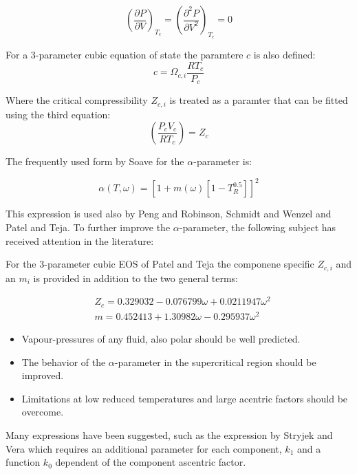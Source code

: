 \documentclass[a4paper, 12pt, english, sintefheadings, sintefcolour]{sintefmemo}
\begin{document}
\begin{equation}
\left(\frac{\partial P}{\partial V}\right)_{T_c}=\left(\frac{\partial^2 P}{\partial V^2}\right)_{T_c}=0
\end{equation}


For a 3-parameter cubic equation of state the paramtere $c$ is also defined:
\begin{equation}
c=\Omega_{c,i}\frac{RT_c}{P_c}
\end{equation} 

Where the critical compressibility $Z_{c,i}$ is treated as a paramter that can
be fitted using the third equation:
\begin{equation}
\left(\frac{P_cV_c}{RT_c}\right) = Z_c
\end{equation}


The frequently used form by Soave for the $\alpha$-parameter is:

\begin{equation} \label{eq:alpha}
\alpha\left(T,\omega\right)=\left[1+m\left(\omega\right)\left[1-T_R^{0.5}\right]\right]^2
\end{equation}   

This expression is used also by Peng and Robinson, Schmidt and Wenzel and
Patel and Teja. To further improve the $\alpha$-parameter, the following
subject has received attention in the literature:

For the 3-parameter cubic EOS of Patel and Teja the componene specific
$Z_{c,i}$ and an $m_i$ is provided in addition to the two general terms:

\begin{equation}
\begin{split}
&Z_c = 0.329032 - 0.076799\omega + 0.0211947\omega^2 \\
&m = 0.452413 + 1.30982\omega -0.295937\omega^2
\end{split}
\end{equation} 


\begin{itemize}
\item Vapour-pressures of any fluid, also polar should be well predicted.
\item The behavior of the $\alpha$-parameter in the supercritical region should be improved. 
\item Limitations at low reduced temperatures and large acentric factors should be overcome.
\end{itemize}

Many expressions have been suggested, such as the expression by Stryjek and
Vera which requires an additional parameter for each component, $k_1$ and a
function $k_0$ dependent of the component ascentric factor.
\end{document}
